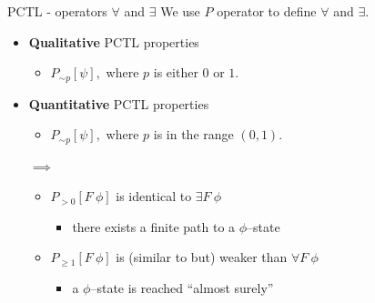 \documentclass[dvipsnames]{beamer}
\begin{document}
\begin{frame}{PCTL - operators $\forall$ and $\exists$}
    We use $P$ operator to define $\forall$ and $\exists$.
    \begin{itemize}
        \item
              \textbf{Qualitative}
              PCTL properties

              \begin{itemize}
                  \item[]
                        $
                            P_{\sim p}[\psi],
                        $
                        where $p$ is either $0$ or $1$.
              \end{itemize}

        \item
              \textbf{Quantitative}
              PCTL properties

              \begin{itemize}
                  \item[]
                        $
                            P_{\sim p}[\psi],
                        $
                        where $p$ is in the range $(0,1)$.
              \end{itemize}

              \vspace{1em}
              $\implies$
              \begin{itemize}
                  \item[]
                        {
                        $P_{>0}[F\ \phi]$
                        }
                        is identical to
                        $\exists F\ \phi$

                        \begin{itemize}
                            \item[]
                                  there exists a finite path to a $\phi$--state
                        \end{itemize}

                  \item[]
                        {
                        $P_{\geq 1}[F\ \phi]$
                        }
                        is (similar to but) weaker than
                        $\forall F\ \phi$

                        \begin{itemize}
                            \item[]
                                  a $\phi$--state is reached ``almost surely''
                        \end{itemize}
              \end{itemize}
    \end{itemize}

\end{frame}
\end{document}
